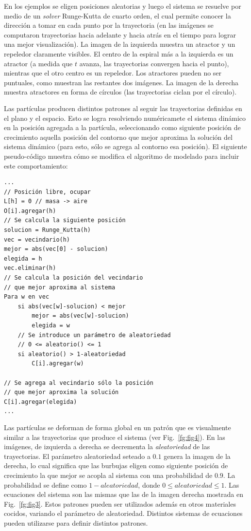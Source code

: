 \documentclass[oneside,a4paper,spanish,links]{amca}
\begin{document}
En los ejemplos se eligen posiciones aleatorias y luego el sistema se resuelve por medio de un {\em solver} Runge-Kutta de cuarto orden, el cual permite conocer la direcci\'on a tomar en cada punto por la trayectoria (en las im\'agenes se computaron trayectorias hacia adelante y hacia atrás en el tiempo para lograr una mejor visualizaci\'on). La imagen de la izquierda muestra un atractor y un repeledor claramente visibles. El centro de la espiral m\'as a la izquierda es un atractor (a medida que $t$ avanza, las trayectorias convergen hacia el punto), mientras que el otro centro es un repeledor. Los atractores pueden no ser puntuales, como muestran las restantes dos im\'agenes. La imagen de la derecha muestra atractores en forma de c\'irculos (las trayectorias ciclan por el c\'irculo).

Las part\'iculas producen distintos patrones al seguir las trayectorias definidas en el plano y el espacio. Esto se logra resolviendo num\'ericamete el sistema din\'amico en la posici\'on agregada a la part\'icula, seleccionando como siguiente posici\'on de crecimiento aquella posici\'on del contorno que mejor aproxima la soluci\'on del sistema din\'amico (para esto, sólo se agrega al contorno esa posición). El siguiente pseudo-código muestra cómo se modifica el algoritmo de modelado para incluir este comportamiento:

\begin{verbatim}
...
// Posición libre, ocupar
L[h] = 0 // masa -> aire
O[i].agregar(h)
// Se calcula la siguiente posición
solucion = Runge_Kutta(h)
vec = vecindario(h)
mejor = abs(vec[0] - solucion)
elegida = h
vec.eliminar(h)
// Se calcula la posición del vecindario
// que mejor aproxima al sistema
Para w en vec
    si abs(vec[w]-solucion) < mejor
        mejor = abs(vec[w]-solucion)
        elegida = w
    // Se introduce un parámetro de aleatoriedad
    // 0 <= aleatorio() <= 1
    si aleatorio() > 1-aleatoriedad 
        C[i].agregar(w)

// Se agrega al vecindario sólo la posición
// que mejor aproxima la solución
C[i].agregar(elegida)
...
\end{verbatim}


Las part\'iculas se deforman de forma global en un patr\'on que es visualmente similar a las trayectorias que produce el sistema (ver Fig.~\ref{fg:fig4}). En las im\'agenes, de izquierda a derecha se decrementa la {\em aleatoriedad} de las trayectorias. El par\'ametro aleatoriedad seteado a $0.1$ genera la imagen de la derecha, lo cual significa que las burbujas eligen como siguiente posición de crecimiento la que mejor se acopla al sistema con una probabilidad de $0.9$. La probabilidad se define como $1-aleatoriedad$, donde $0 \leq aleatoriedad \leq 1$. Las ecuaciones del sistema son las mismas que las de la imagen derecha mostrada en Fig.~\ref{fg:fig3}. Estos patrones pueden ser utilizados adem\'as en otros materiales cocidos, variando el par\'ametro de aleatoriedad. Distintos sistemas de ecuaciones pueden utilizarse para definir distintos patrones.
\end{document}
